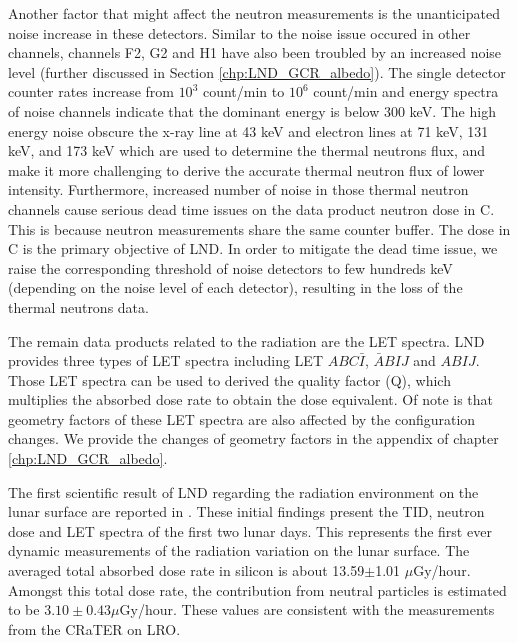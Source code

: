Another factor that might affect the neutron measurements is the unanticipated noise increase in these detectors. Similar to the noise issue occured in other channels, channels F2, G2 and H1 have also been troubled by an increased noise level (further discussed in Section \ref{chp:LND_GCR_albedo}). The single detector counter rates increase from $10^3$ count/min to $10^6$ count/min and energy spectra of noise channels indicate that the dominant energy is below 300 keV.
The high energy noise obscure the x-ray line at 43 keV and electron lines at 71 keV, 131 keV, and 173 keV which are used to determine the thermal neutrons flux, and make it more challenging to derive the accurate thermal neutron flux of lower intensity.
Furthermore, increased number of noise in those thermal neutron channels cause serious dead time issues on the data product neutron dose in C. This is because neutron measurements share the same counter buffer. The dose in C is the primary objective of \ac{LND}. In order to mitigate the dead time issue, we raise the corresponding threshold of noise detectors to few hundreds keV (depending on the noise level of each detector), resulting in the loss of the thermal neutrons data.


The remain data products related to the radiation are the \ac{LET} spectra. \ac{LND} provides three types of \ac{LET} spectra including \ac{LET} $ABC\bar{I}$, $\bar{A}BIJ$ and $ABIJ$. Those \ac{LET} spectra can be used to derived the quality factor (Q), which multiplies the absorbed dose rate to obtain the dose equivalent.
Of note is that geometry factors of these \ac{LET} spectra are also affected by the configuration changes. We provide the changes of geometry factors in the appendix of chapter \ref{chp:LND_GCR_albedo}.

The first scientific result of \ac{LND} regarding the radiation environment on the lunar surface are reported in \citep{Zhang-2020-LND-firstresults}. These initial findings present the \ac{TID}, neutron dose and \ac{LET} spectra of the first two lunar days. This represents the first ever dynamic measurements of the radiation variation on the lunar surface. The averaged total absorbed dose rate in silicon is about 13.59$\pm$1.01 $\mu$Gy/hour. Amongst this total dose rate, the contribution from neutral particles is estimated to be $3.10 \pm 0.43 \mu$Gy/hour. These values are consistent with the measurements from the \ac{CRaTER} on \ac{LRO}.



